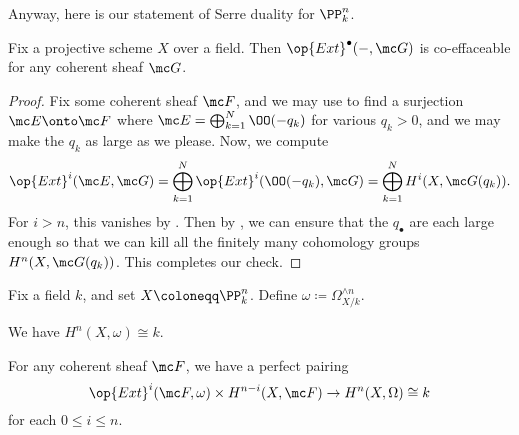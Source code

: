 \documentclass[../notes.tex]{subfiles}
\begin{document}
Anyway, here is our statement of Serre duality for $\PP^n_k$.
\begin{lemma} \label{lem:ext-is-uni}
	Fix a projective scheme $X$ over a field. Then $\op{Ext}^\bullet(-,\mc G)$ is co-effaceable for any coherent sheaf $\mc G$.
\end{lemma}
\begin{proof}
	Fix some coherent sheaf $\mc F$, and we may use \cite[Corollary~II.5.18]{hartshorne} to find a surjection $\mc E\onto\mc F$ where $\mc E=\bigoplus_{k=1}^N\OO(-q_k)$ for various $q_k>0$, and we may make the $q_k$ as large as we please. Now, we compute
	\[\op{Ext}^i(\mc E,\mc G)=\bigoplus_{k=1}^N\op{Ext}^i(\OO(-q_k),\mc G)=\bigoplus_{k=1}^NH^i(X,\mc G(q_k)).\]
	For $i>n$, this vanishes by . Then by , we can ensure that the $q_\bullet$ are each large enough so that we can kill all the finitely many cohomology groups $H^n(X,\mc G(q_k))$. This completes our check.
\end{proof}
\begin{theorem} \label{thm:serre-duality-pn}
	Fix a field $k$, and set $X\coloneqq\PP^n_k$. Define $\omega\coloneqq\Omega_{X/k}^{\land n}$.
	\begin{listalph}
		\item We have $H^n(X,\omega)\cong k$.
		\item For any coherent sheaf $\mc F$, we have a perfect pairing
		\[\op{Ext}^i(\mc F,\omega)\times H^{n-i}(X,\mc F)\to H^n(X,\Omega)\cong k\]
		for each $0\le i\le n$.
	\end{listalph}
\end{theorem}
\end{document}
